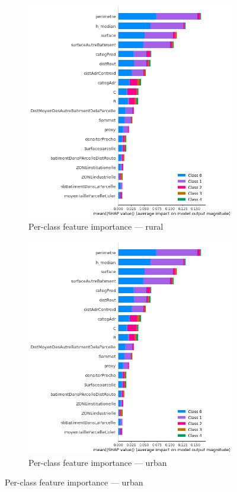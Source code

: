 \documentclass[11pt]{article}
\begin{document}
\begin{figure}[H]
\vspace{0.5cm}

\begin{subfigure}{0.48\textwidth}
    \centering
    \includegraphics[width=\linewidth]{fig11.png}
    \caption{Per-class feature importance — rural}
    \label{fig:fig11}
\end{subfigure}%
\hfill
\begin{subfigure}{0.48\textwidth}
    \centering
    \includegraphics[width=\linewidth]{fig12.png}
    \caption{Per-class feature importance — urban}
    \label{fig:fig12}
\end{subfigure}


\end{figure}
\end{document}
